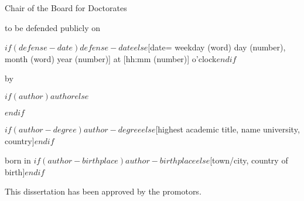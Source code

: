 \begin{titlepage}
\begin{center}
        Chair of the Board for Doctorates

        to be defended publicly on

        $if(defense-date)$$defense-date$$else$[date= weekday (word) day (number), month (word) year (number)] at [hh:mm (number)] o'clock$endif$

        \bigskip
        \bigskip

        by

        \bigskip
        \bigskip

        $if(author)${\Large\titlefont\bfseries $author$}$else$\author{$for(authors)$$it.name.literal$$sep$ \and $endfor$}$endif$
        
        \bigskip
        \bigskip

        $if(author-degree)$$author-degree$$else$[highest academic title, name university, country]$endif$

        born in $if(author-birthplace)$$author-birthplace$$else$[town/city, country of birth]$endif$

        \vspace*{2\bigskipamount}

    \end{center}

    \clearpage
    \thispagestyle{empty}

    \noindent This dissertation has been approved by the promotors.


\end{titlepage}
